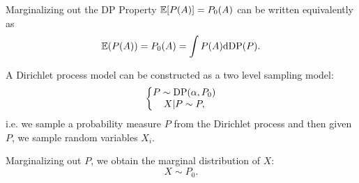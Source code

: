 \begin{frame}{Marginalizing out the DP}
	Property $\mathbb{E}[ P(A)] = P_0(A)$ can be written equivalently as
\begin{equation*}
    \mathbb{E}( P(A)) = P_0(A) = \int P(A)\mathrm{d} \text{DP}(P). 
\end{equation*}

%

A Dirichlet process model can be constructed as a two level sampling model:
\begin{equation*}
    \left \{ \begin{matrix}
P \sim \text{DP}(\alpha, P_0)\\ 
X|P \sim P,
\end{matrix}\right.
\end{equation*}
i.e. we  sample a probability measure $P$ from the Dirichlet process and then given  $P$, we sample random variables $X_i$.\bigskip

\textcolor{red2}{Marginalizing out $P$}, we obtain the marginal distribution of $X$:
$$X\sim P_0.$$

\end{frame}


